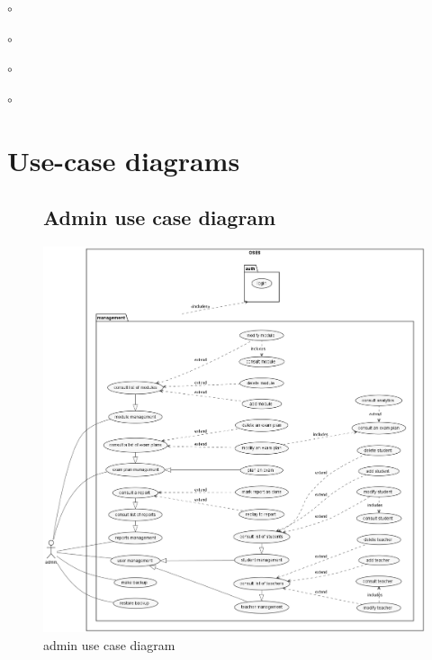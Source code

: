 \documentclass[]{uc2pfecaneva}
\begin{document}
\begin{list}{$\circ$}{}
\begin{list}{$\circ$}{}
\begin{list}{$\circ$}{}
\begin{list}{$\circ$}{}

    \raggedright\section{Use-case diagrams}
    \begin{figure}
        \subsection{Admin use case diagram}
        \centering
        \includegraphics[width=\textwidth]{images/admin_UCD}
        \caption{admin use case diagram}
    \end{figure}
    \clearpage

    \begin{figure}

\end{figure}
\end{list}
\end{list}
\end{list}
\end{list}
\end{document}
